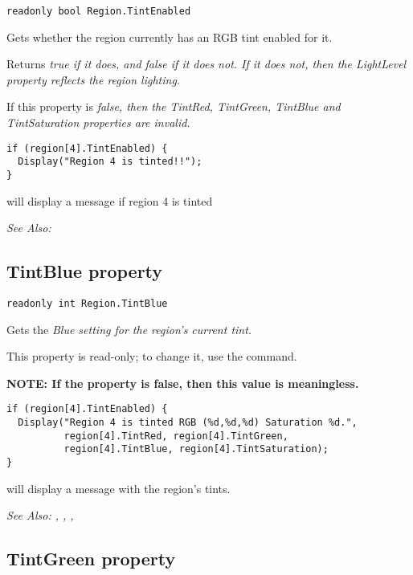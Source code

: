\begin{verbatim}
readonly bool Region.TintEnabled
\end{verbatim}
Gets whether the region currently has an RGB tint enabled for it.

Returns \it{true} if it does, and \it{false} if it does not. If it does not, then
the LightLevel property reflects the region lighting.

If this property is \it{false}, then the TintRed, TintGreen, TintBlue and TintSaturation
properties are invalid.

\begin{verbatim}
if (region[4].TintEnabled) {
  Display("Region 4 is tinted!!");
}
\end{verbatim}
will display a message if region 4 is tinted

\it{See Also:} 


\subsection{TintBlue property}\label{Region.TintBlue}%

\begin{verbatim}
readonly int Region.TintBlue
\end{verbatim}
Gets the \it{Blue} setting for the region's current tint.

This property is read-only; to change it, use the  command.

\bf{NOTE:} If the  property is false, then
this value is meaningless.

\begin{verbatim}
if (region[4].TintEnabled) {
  Display("Region 4 is tinted RGB (%d,%d,%d) Saturation %d.",
          region[4].TintRed, region[4].TintGreen,
          region[4].TintBlue, region[4].TintSaturation);
}
\end{verbatim}
will display a message with the region's tints.

\it{See Also:} , ,
, 


\subsection{TintGreen property}\label{Region.TintGreen}%


